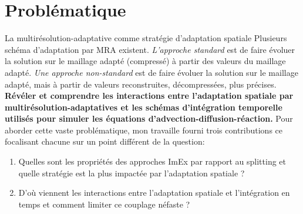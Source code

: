     \section{Problématique}
    La multirésolution-adaptative comme stratégie d'adaptation spatiale 
    Plusieurs schéma d'adaptation par MRA existent. 
        \textit{L'approche standard} est de faire évoluer la solution sur le maillage adapté (compressé) à partir des valeurs du maillage adapté.
        \textit{Une approche non-standard} est de faire évoluer la solution sur le maillage adapté, mais à partir de valeurs reconstruites, décompressées, plus précises.
    \textbf{Révéler et comprendre les interactions entre l'adaptation spatiale par multirésolution-adaptatives et les schémas d'intégration temporelle 
    utilisés pour simuler les équations d'advection-diffusion-réaction.}
    Pour aborder cette vaste problématique, mon travaille fourni trois contributions ce focalisant chacune sur un point différent de la question:
    \begin{enumerate}
        \item Quelles sont les propriétés des approches ImEx par rapport au splitting et quelle stratégie est la plus impactée par l'adaptation spatiale ?
        \item D'où viennent les interactions entre l'adaptation spatiale et l'intégration en temps et comment limiter ce couplage néfaste ?
    \end{enumerate}
